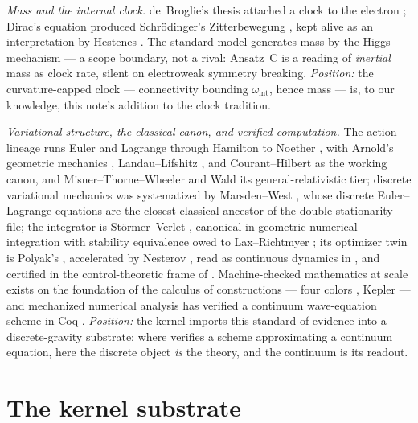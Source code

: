 \documentclass[10pt,twocolumn]{article}
\theoremstyle{definition}
\begin{document}
\emph{Mass and the internal clock.} de~Broglie's thesis attached a clock to the
electron \cite{debroglie}; Dirac's equation \cite{dirac} produced
Schr\"odinger's Zitterbewegung \cite{schrodinger}, kept alive as an
interpretation by Hestenes \cite{hestenes}. The standard model generates mass by
the Higgs mechanism \cite{higgs} --- a scope boundary, not a rival: Ansatz~C is a
reading of \emph{inertial} mass as clock rate, silent on electroweak symmetry
breaking. \emph{Position:} the curvature-capped clock --- connectivity bounding
$\omega_{\mathrm{int}}$, hence mass --- is, to our knowledge, this note's
addition to the clock tradition.

\emph{Variational structure, the classical canon, and verified computation.}
The action lineage runs Euler \cite{euler} and Lagrange \cite{lagrange} through
Hamilton \cite{hamilton} to Noether \cite{noether}, with Arnold's geometric
mechanics \cite{arnold}, Landau--Lifshitz \cite{landaulifshitz}, and
Courant--Hilbert \cite{couranthilbert} as the working canon, and
Misner--Thorne--Wheeler \cite{mtw} and Wald \cite{wald} its general-relativistic
tier; discrete variational
mechanics was systematized by Marsden--West \cite{marsdenwest}, whose discrete
Euler--Lagrange equations are the closest classical ancestor of the double
stationarity file; the integrator is St\"ormer--Verlet \cite{stormer,verlet}, canonical in geometric
numerical integration \cite{hlw} with stability equivalence owed to
Lax--Richtmyer \cite{laxrichtmyer}; its optimizer twin is Polyak's
\cite{polyak}, accelerated by Nesterov \cite{nesterov}, read as continuous
dynamics in \cite{subc}, and certified in the control-theoretic frame of
\cite{lessard}. Machine-checked mathematics at scale exists on the foundation of the calculus
of constructions \cite{coquandhuet} --- four colors \cite{gonthier}, Kepler
\cite{hales} --- and mechanized numerical
analysis has verified a continuum wave-equation scheme in Coq \cite{boldo}.
\emph{Position:} the kernel imports this standard of evidence into a
discrete-gravity substrate: where \cite{boldo} verifies a scheme approximating a
continuum equation, here the discrete object \emph{is} the theory, and the
continuum is its readout.

\section{The kernel substrate}\label{sec:kernel}
\end{document}
